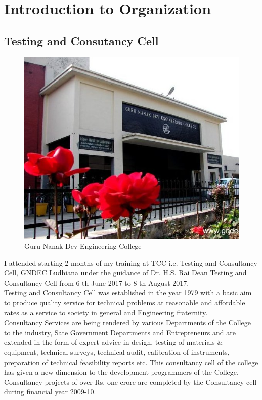 
\section{Introduction to Organization}
\subsection{Testing and Consutancy Cell}
\begin{figure}[ht]
\centering
\includegraphics[scale=0.5]{input/images/gndec.jpg}
\caption{Guru Nanak Dev Engineering College}
\end{figure}
\hspace{-1.7em} 
\noindent I attended starting 2 months of my training at TCC i.e. Testing and Consultancy Cell, GNDEC Ludhiana
under the guidance of Dr. H.S. Rai Dean Testing and Consultancy Cell from 6 th June 2017 to 8 th August
2017.\\

\noindent Testing and Consultancy Cell was established in the year 1979 with a basic aim to produce quality
service for technical problems at reasonable and affordable rates as a service to society in general and
Engineering fraternity.\\

\noindent Consultancy Services are being rendered by various Departments of the College to the
industry, Sate Government Departments and Entrepreneurs and are extended in the form of
expert advice in design, testing of materials \& equipment, technical surveys, technical audit,
calibration of instruments, preparation of technical feasibility reports etc.
This consultancy cell of the college has given a new dimension to the development
programmers of the College. Consultancy projects of over Rs. one crore are completed by the
Consultancy cell during financial year 2009-10. \\


